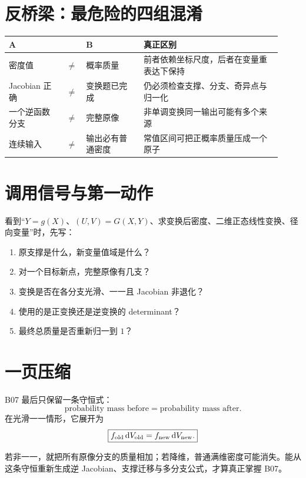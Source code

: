 \documentclass[profile=standard]{ipara-handbook}
\begin{document}
\section{反桥梁：最危险的四组混淆}
\begin{tabular}{p{0.20\linewidth}p{0.04\linewidth}p{0.20\linewidth}p{0.48\linewidth}}
\hline
A & & B & 真正区别\\
\hline
密度值 & $\neq$ & 概率质量 & 前者依赖坐标尺度，后者在变量重表达下保持\\
Jacobian 正确 & $\neq$ & 变换题已完成 & 仍必须检查支撑、分支、奇异点与归一化\\
一个逆函数分支 & $\neq$ & 完整原像 & 非单调变换同一输出可能有多个来源\\
连续输入 & $\neq$ & 输出必有普通密度 & 常值区间可把正概率质量压成一个原子\\
\hline
\end{tabular}

\section{调用信号与第一动作}
看到“$Y=g(X)$、$(U,V)=G(X,Y)$、求变换后密度、二维正态线性变换、径向变量”时，先写：
\begin{enumerate}
\item 原支撑是什么，新变量值域是什么？
\item 对一个目标新点，完整原像有几支？
\item 变换是否在各分支光滑、一一且 Jacobian 非退化？
\item 使用的是正变换还是逆变换的 determinant？
\item 最终总质量是否重新归一到 $1$？
\end{enumerate}

\section{一页压缩}
B07 最后只保留一条守恒式：
\[
\boxed{\text{probability mass before}=\text{probability mass after}.}
\]
在光滑一一情形，它展开为
\[
\boxed{f_{\rm old}\,\mathrm{d}V_{\rm old}=f_{\rm new}\,\mathrm{d}V_{\rm new}.}
\]

若非一一，就把所有原像分支的质量相加；若降维，普通满维密度可能消失。能从这条守恒重新生成逆 Jacobian、支撑迁移与多分支公式，才算真正掌握 B07。
\end{document}
